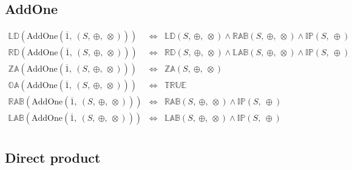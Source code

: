 \documentclass[10pt]{report}
\newcommand{\propname}[1]{{\mathbb{#1}}}
\begin{document}
\subsection{AddOne} 

\[
\begin{array}{rcl} 
\propname{LD}(\mathrm{AddOne}(\overline{1},\ (S,\ \oplus,\ \otimes))) 
    & \Leftrightarrow %
    & \propname{LD}(S,\ \oplus,\ \otimes) 
      \wedge \propname{RAB}(S,\ \oplus,\ \otimes) 
      \wedge  \propname{IP}(S,\ \oplus) 
    \\
\propname{RD}(\mathrm{AddOne}(\overline{1},\ (S,\ \oplus,\ \otimes))) 
    & \Leftrightarrow %
    & \propname{RD}(S,\ \oplus,\ \otimes) 
      \wedge\propname{LAB}(S,\ \oplus,\ \otimes) 
      \wedge\propname{IP}(S,\ \oplus) 
    \\
\propname{ZA}(\mathrm{AddOne}(\overline{1},\ (S,\ \oplus,\ \otimes))) 
    & \Leftrightarrow %
    & \propname{ZA}(S,\ \oplus,\ \otimes) \\
\propname{OA}(\mathrm{AddOne}(\overline{1},\ (S,\ \oplus,\ \otimes))) 
    & \Leftrightarrow %
    & \propname{TRUE}\\ 
\propname{RAB}(\mathrm{AddOne}(\overline{1},\ (S,\ \oplus,\ \otimes))) 
    & \Leftrightarrow %
    & \propname{RAB}(S,\ \oplus,\ \otimes) 
      \wedge \propname{IP}(S,\ \oplus) \\ 
\propname{LAB}(\mathrm{AddOne}(\overline{1},\ (S,\ \oplus,\ \otimes))) 
    & \Leftrightarrow %
    & \propname{LAB}(S,\ \oplus,\ \otimes)
      \wedge \propname{IP}(S,\ \oplus) 
\\ 
\end{array} 
\] 



\subsection{Direct product} 
\end{document}

